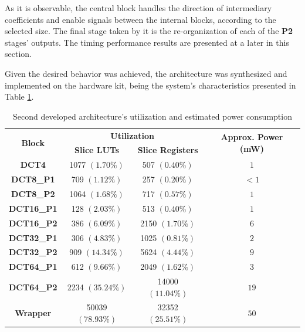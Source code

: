As it is observable, the central block handles the direction of intermediary coefficients and enable signals between the internal blocks, according to the selected size. The final stage taken by it is the re-organization of each of the \textbf{P2} stages' outputs. The timing performance results are presented at a later in this section.

Given the desired behavior was achieved, the architecture was synthesized and implemented on the hardware kit, being the system's characteristics presented in Table \ref{tab:v2results}.

\begin{table}[!htpb]
    \centering
    \begin{tabular}{cccc} \toprule
        \multirow{2}{*}{\textbf{Block}}     & \multicolumn{2}{c}{\textbf{Utilization}}              & \multirow{2}{*}{\textbf{Approx. Power (mW)}}   \\
                                            & \textbf{Slice LUTs}      & \textbf{Slice Registers}   &                                                \\ \toprule
        \textbf{DCT4}                       & 1077 $(1.70\%)$          & 507 $(0.40\%)$             & $1$ \\
        \textbf{DCT8\_P1}                   & 709 $(1.12\%)$           & 257 $(0.20\%)$             & $<1$ \\
        \textbf{DCT8\_P2}                   & 1064 $(1.68\%)$          & 717 $(0.57\%)$             & $1$ \\
        \textbf{DCT16\_P1}                  & 128 $(2.03\%)$           & 513 $(0.40\%)$             & $1$ \\
        \textbf{DCT16\_P2}                  & 386 $(6.09\%)$           & 2150 $(1.70\%)$            & $6$ \\
        \textbf{DCT32\_P1}                  & 306 $(4.83\%)$           & 1025 $(0.81\%)$            & $2$ \\
        \textbf{DCT32\_P2}                  & 909 $(14.34\%)$          & 5624 $(4.44\%)$            & $9$ \\
        \textbf{DCT64\_P1}                  & 612 $(9.66\%)$           & 2049 $(1.62\%)$            & $3$ \\
        \textbf{DCT64\_P2}                  & 2234 $(35.24\%)$         & 14000 $(11.04\%)$          & $19$ \\ \bottomrule
        \textbf{Wrapper}                    & 50039 $(78.93\%)$        & 32352 $(25.51\%)$          & $50$ \\
        \bottomrule
    \end{tabular}
    \caption{Second developed architecture's utilization and estimated power consumption}
    \label{tab:v2results}
\end{table}

